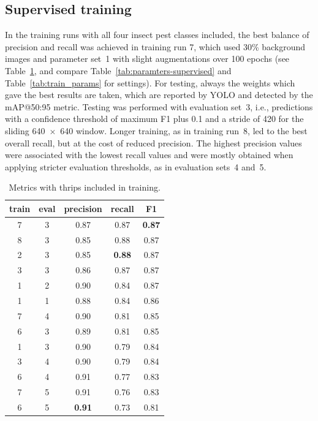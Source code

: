\documentclass[12pt,a4paper]{article}
\begin{document}
\subsection{Supervised training}
\label{sec:results_supervised}
In the training runs with all four insect pest classes included, the best balance of precision and recall was achieved in training run 7, which used 30\% background images and parameter set~1 with slight augmentations over 100 epochs (see Table~\ref{tab:thrips_included}, and compare Table~\ref{tab:paramters-supervised} and Table~\ref{tab:train_params} for settings). For testing, always the weights which gave the best results are taken, which are reported by YOLO and detected by the mAP@50:95 metric. Testing was performed with evaluation set~3, i.e., predictions with a confidence threshold of maximum F1 plus 0.1 and a stride of 420 for the sliding 640~$\times$~640 window. Longer training, as in training run~8, led to the best overall recall, but at the cost of reduced precision. The highest precision values were associated with the lowest recall values and were mostly obtained when applying stricter evaluation thresholds, as in evaluation sets~4 and~5. 

\begin{table}[h!]
\centering
\begin{tabular}{|c|c|c|c|c|}
\hline
train & eval & precision & recall & F1 \\
\hline
7 & 3 & 0.87 & 0.87 & \textbf{0.87} \\
8 & 3 & 0.85 & 0.88 & 0.87 \\
2 & 3 & 0.85 & \textbf{0.88} & 0.87 \\
3 & 3 & 0.86 & 0.87 & 0.87 \\
1 & 2 & 0.90 & 0.84 & 0.87 \\
1 & 1 & 0.88 & 0.84 & 0.86 \\
7 & 4 & 0.90 & 0.81 & 0.85 \\
6 & 3 & 0.89 & 0.81 & 0.85 \\
1 & 3 & 0.90 & 0.79 & 0.84 \\
3 & 4 & 0.90 & 0.79 & 0.84 \\
6 & 4 & 0.91 & 0.77 & 0.83 \\
7 & 5 & 0.91 & 0.76 & 0.83 \\
6 & 5 & \textbf{0.91} & 0.73 & 0.81 \\
\hline
\end{tabular}
\caption{Metrics with thrips included in training.}
\label{tab:thrips_included}
\end{table}
\end{document}
